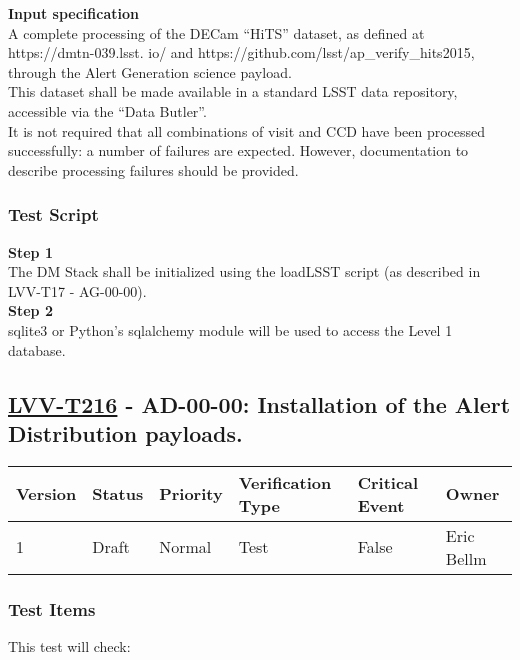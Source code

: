 \textbf{Input specification}\\[2\baselineskip]A complete processing of
the DECam ``HiTS'' dataset, as defined at https://dmtn-039.lsst. io/ and
https://github.com/lsst/ap\_verify\_hits2015, through the Alert
Generation science payload.\\
This dataset shall be made available in a standard LSST data repository,
accessible via the ``Data Butler''.\\
It is not required that all combinations of visit and CCD have been
processed successfully: a number of failures are expected. However,
documentation to describe processing failures should be provided.

\subsubsection{Test Script}\label{test-script-5}

\textbf{Step 1}\\
The DM Stack shall be initialized using the loadLSST script (as
described in LVV-T17 - AG-00-00).\\[2\baselineskip]\textbf{Step 2}\\
sqlite3 or Python's sqlalchemy module will be used to access the Level 1
database.\\[2\baselineskip]

\subsection{\texorpdfstring{\href{https://jira.lsstcorp.org/secure/Tests.jspa\#/testCase/LVV-T216}{LVV-T216}
- AD-00-00: Installation of the Alert Distribution
payloads.}{LVV-T216 - AD-00-00: Installation of the Alert Distribution payloads.}}\label{lvv-t216---ad-00-00-installation-of-the-alert-distribution-payloads.}

\begin{longtable}[]{@{}llllll@{}}
\toprule
Version & Status & Priority & Verification Type & Critical Event &
Owner\tabularnewline
\midrule
\endhead
1 & Draft & Normal & Test & False & Eric Bellm\tabularnewline
\bottomrule
\end{longtable}

\subsubsection{Test Items}\label{test-items-6}

This test will check:\\[2\baselineskip]

